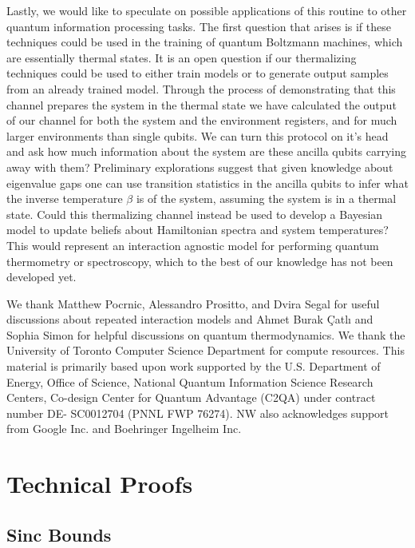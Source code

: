 \documentclass[
 amsmath,amssymb,
 aps,
onecolumn, 
nofootinbib]{revtex4-2}
\begin{document}
Lastly, we would like to speculate on possible applications of this routine to other quantum information processing tasks. The first question that arises is if these techniques could be used in the training of quantum Boltzmann machines, which are essentially thermal states. It is an open question if our thermalizing techniques could be used to either train models or to generate output samples from an already trained model. Through the process of demonstrating that this channel prepares the system in the thermal state we have calculated the output of our channel for both the system and the environment registers, and for much larger environments than single qubits. We can turn this protocol on it's head and ask how much information about the system are these ancilla qubits carrying away with them? Preliminary explorations suggest that given knowledge about eigenvalue gaps one can use transition statistics in the ancilla qubits to infer what the inverse temperature $\beta$ is of the system, assuming the system is in a thermal state. Could this thermalizing channel instead be used to develop a Bayesian model to update beliefs about Hamiltonian spectra and system temperatures? This would represent an interaction agnostic model for performing quantum thermometry or spectroscopy, which to the best of our knowledge has not been developed yet. 

\begin{acknowledgments}
We thank Matthew Pocrnic, Alessandro Prositto, and Dvira Segal for useful discussions about repeated interaction models and Ahmet Burak Çatlı and Sophia Simon for helpful discussions on quantum thermodynamics. We thank the University of Toronto Computer Science Department for compute resources. This material is primarily based upon work supported by the U.S. Department of Energy, Office of Science, National Quantum Information Science Research Centers, Co-design Center for Quantum Advantage (C2QA) under contract number DE- SC0012704 (PNNL FWP 76274).  NW also acknowledges support from Google Inc. and Boehringer Ingelheim Inc.
\end{acknowledgments}



\appendix 


\section{Technical Proofs} \label{sec:appendix}
\subsection{Sinc Bounds} \label{sec:appendix_sinc}
\end{document}

